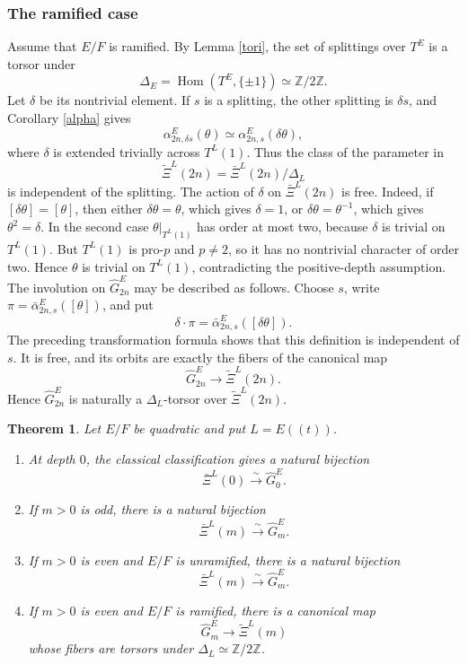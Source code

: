 \documentclass[11pt,a4paper,twoside]{amsart}
\newtheorem{theorem}{Theorem}[section]
\theoremstyle{definition}
\theoremstyle{remark}
\newcommand{\D}{\Delta}
\newcommand{\ZZ}{\mathbb Z}
\newcommand{\ti}{\widetilde}
\newcommand{\Hom}{\operatorname{Hom}}
\begin{document}
\subsubsection{The ramified case}
Assume that $E/F$ is ramified. By Lemma \ref{tori}, the set of splittings over $T^E$ is a torsor under
$$
\D_E=\Hom(T^E,\{\pm1\})\simeq\ZZ/2\ZZ.
$$
Let $\delta$ be its nontrivial element. If $s$ is a splitting, the other splitting is $\delta s$, and Corollary \ref{alpha} gives
$$
\alpha_{2n,\delta s}^E(\theta)
\simeq
\alpha_{2n,s}^E(\delta\theta),
$$
where $\delta$ is extended trivially across $T^L(1)$. Thus the class of the parameter in
$$
\ti\Xi^L(2n)=\bar\Xi^L(2n)/\D_L
$$
is independent of the splitting.
The action of $\delta$ on $\bar\Xi^L(2n)$ is free. Indeed, if $[\delta\theta]=[\theta]$, then either $\delta\theta=\theta$, which gives $\delta=1$, or $\delta\theta=\theta^{-1}$, which gives $\theta^2=\delta$. In the second case $\theta|_{T^L(1)}$ has order at most two, because $\delta$ is trivial on $T^L(1)$. But $T^L(1)$ is pro-$p$ and $p\neq2$, so it has no nontrivial character of order two. Hence $\theta$ is trivial on $T^L(1)$, contradicting the positive-depth assumption.
The involution on $\widehat G_{2n}^E$ may be described as follows. Choose $s$, write $\pi=\bar\alpha_{2n,s}^E([\theta])$, and put
$$
\delta\cdot\pi=\bar\alpha_{2n,s}^E([\delta\theta]).
$$
The preceding transformation formula shows that this definition is independent of $s$. It is free, and its orbits are exactly the fibers of the canonical map
$$
\widehat G_{2n}^E\longrightarrow\ti\Xi^L(2n).
$$
Hence $\widehat G_{2n}^E$ is naturally a $\D_L$-torsor over $\ti\Xi^L(2n)$.
\begin{theorem}\label{equnr}
Let $E/F$ be quadratic and put $L=E((t))$.
\begin{enumerate}
\item At depth $0$, the classical classification gives a natural bijection
$$
\bar\Xi^L(0)\stackrel{\sim}{\longrightarrow}\widehat G_0^E.
$$
\item If $m>0$ is odd, there is a natural bijection
$$
\bar\Xi^L(m)\stackrel{\sim}{\longrightarrow}\widehat G_m^E.
$$
\item If $m>0$ is even and $E/F$ is unramified, there is a natural bijection
$$
\bar\Xi^L(m)\stackrel{\sim}{\longrightarrow}\widehat G_m^E.
$$
\item If $m>0$ is even and $E/F$ is ramified, there is a canonical map
$$
\widehat G_m^E\longrightarrow\ti\Xi^L(m)
$$
whose fibers are torsors under $\D_L\simeq\ZZ/2\ZZ$.
\end{enumerate}
\end{theorem}
\end{document}
